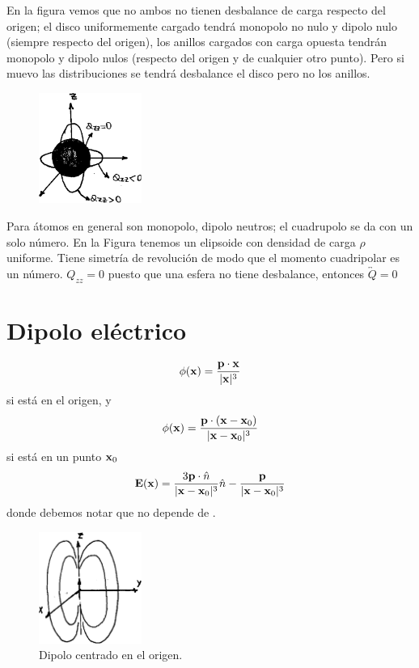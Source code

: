 \documentclass[10pt,oneside]{CBFT_book}
\begin{document}
En la figura vemos que no ambos no tienen desbalance de carga respecto del origen; el disco uniformemente
cargado tendrá monopolo no nulo y dipolo nulo (siempre respecto del origen), los anillos cargados con carga
opuesta tendrán monopolo y dipolo nulos (respecto del origen y de cualquier otro punto). Pero si muevo las
distribuciones se tendrá desbalance el disco pero no los anillos.

\begin{figure}[htb]
	\begin{center}
	\includegraphics[width=0.3\textwidth]{images/fig_ft1_multipolo4.pdf}	 
	\end{center}
	\caption{}
\end{figure}

Para átomos en general son monopolo, dipolo neutros; el cuadrupolo se da con un solo número. 
En la Figura tenemos un elipsoide con densidad de carga $\rho$ uniforme. Tiene simetría de revolución
de modo que el momento cuadripolar es un número. $Q_{zz} = 0 $ puesto que una esfera no tiene
desbalance, entonces $\overleftrightarrow{Q} = 0 $ 


\section{Dipolo eléctrico}

\[
	\phi(\vb{x}) = \frac{ \vb{p}\cdot\vb{x} }{|\vb{x}|^3} 
\]
si está en el origen, y
\[
	\phi(\vb{x}) = \frac{ \vb{p}\cdot(\vb{x}-\vb{x}_0) }{|\vb{x} - \vb{x}_0|^3} 
\]
si está en un punto $\vb{x}_0$
\[
	\vb{E}(\vb{x}) = \frac{3 \vb{p}\cdot\hat{n} }{|\vb{x} - \vb{x}_0|^3}  \hat{n} - 
		\frac{ \vb{p} }{|\vb{x} - \vb{x}_0|^3}	
\]
donde debemos notar que  no depende de .

\begin{figure}[htb]
	\begin{center}
	\includegraphics[width=0.3\textwidth]{images/fig_ft1_dipolar2.pdf}	 
	\end{center}
	\caption{Dipolo centrado en el origen.}
\end{figure}
\end{document}
